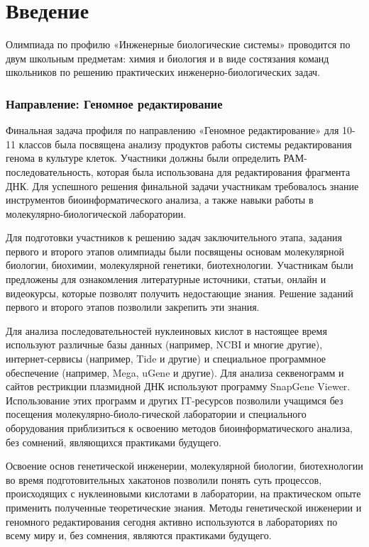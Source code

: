 \begingroup
\pagestyle{empty}

\section*{Введение}

Олимпиада по профилю «Инженерные биологические системы»  проводится по двум школьным предметам: химия и биология и в виде состязания команд школьников по решению практических инженерно-биологических задач.

\subsubsection*{Направление: Геномное редактирование}

Финальная задача профиля по направлению «Геномное редактирование» для 10-11 классов была посвящена анализу продуктов работы системы редактирования генома в культуре клеток. Участники должны были определить РАМ-последовательность, которая была использована для редактирования фрагмента ДНК. Для успешного решения финальной задачи участникам требовалось знание инструментов биоинформатического анализа, а также навыки работы в молекулярно-биологической лаборатории. 

Для подготовки участников к решению задач заключительного этапа, задания первого и второго этапов олимпиады были посвящены основам молекулярной биологии, биохимии, молекулярной генетики, биотехнологии. Участникам были предложены для ознакомления литературные источники, статьи, онлайн и видеокурсы, которые позволят получить недостающие знания. Решение заданий первого и второго этапов позволили закрепить эти знания. 

Для анализа последовательностей нуклеиновых кислот в настоящее время используют различные базы данных (например, NCBI и многие другие), интернет-сервисы (например, Tide и другие) и специальное программное обеспечение (например, Mega, uGene и другие). Для анализа секвенограмм и сайтов рестрикции плазмидной ДНК используют программу SnapGene Viewer. Использование этих программ и других IT-ресурсов позволили учащимся без посещения молекулярно-биоло-гической лаборатории и специального оборудования приблизиться к освоению методов биоинформатического анализа, без сомнений, являющихся практиками будущего. 

Освоение основ генетической инженерии, молекулярной биологии, биотехнологии во время подготовительных хакатонов позволили понять суть процессов, происходящих с нуклеиновыми кислотами в лаборатории, на практическом опыте применить полученные теоретические знания. Методы генетической инженерии и геномного редактирования сегодня активно используются в лабораториях по всему миру и, без сомнения, являются практиками будущего. 

